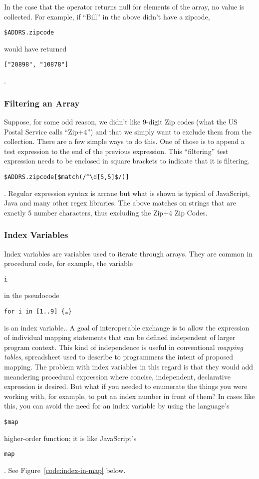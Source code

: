 \documentclass[9pt,letterpaper]{article}
\newcommand{\stt}[1]{\begin{footnotesize}\texttt{#1}\end{footnotesize}}
\begin{document}
  In the case that the operator returns null for elements of the array, no value is collected.
  For example, if ``Bill'' in the above didn't have a zipcode, \stt{\$ADDRS.zipcode} would have returned \stt{["20898", "10878"]}.

\subsubsection{Filtering  an Array}
Suppose, for some odd reason, we didn't like 9-digit Zip codes (what the US Postal Service calls ``Zip+4'') and that we simply want to exclude them from the collection.
There are a few simple ways to do this.
One of those is to append a test expression to the end of the previous expression. This ``filtering'' test expression needs to be enclosed in square brackets to indicate that it is filtering.
\stt{\$ADDRS.zipcode[\$match(/\^{}\textbackslash d[5,5]\$/)]}. Regular expression syntax is arcane but what is shown is typical of JavaScript, Java and many other regex libraries.
The above matches on strings that are exactly 5 number characters, thus excluding the Zip+4 Zip Codes.

\subsubsection{Index Variables} %
Index variables are variables used to iterate through arrays.
They are common in procedural code, for example, the variable \stt{i} in the pseudocode \stt{for i in [1..9] \{\ldots \}} is an index variable..
A goal of interoperable exchange is to allow the expression of individual mapping statements that can be defined independent of larger program context.
This kind of independence is useful in conventional \textit{mapping tables}, spreadsheet used to describe to programmers the intent of proposed mapping.
The problem with index variables in this regard is that they would add meandering procedural expression where concise, independent, declarative expression is desired.
But what if you needed to enumerate the things you were working with, for example, to put an index number in front of them?
In cases like this, you can avoid the need for an index variable by using the language's \stt{\$map} higher-order function; it is like JavaScript's \stt{map}.
See Figure~\ref{code:index-in-map} below.
\end{document}
